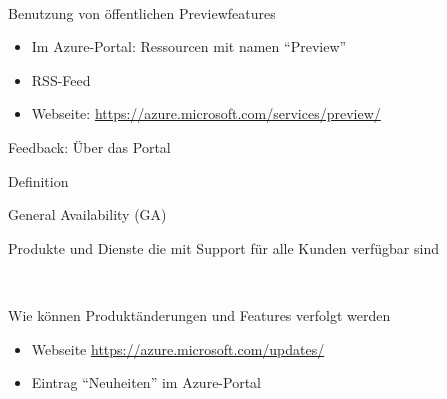 \documentclass{scrartcl}
\newenvironment{flashcard}[2][]{%
    #1
    \vfill
    \centerline{\Large{#2}}
    \vfill
\newpage
}
{\newpage}
\begin{document}
    \begin{flashcard}[\ ]{Benutzung von öffentlichen Previewfeatures}
        \begin{itemize}
            \item Im Azure-Portal: Ressourcen mit namen ``Preview''
            \item RSS-Feed
            \item Webseite: \href{https://azure.microsoft.com/services/preview/}{https://azure.microsoft.com/services/preview/}
        \end{itemize}

        \vspace{5mm}
        Feedback: Über das Portal
    \end{flashcard}

    \begin{flashcard}[Definition]{General Availability (GA)}
        Produkte und Dienste die mit Support für alle Kunden verfügbar sind
    \end{flashcard}

    \begin{flashcard}[\ ]{Wie können Produktänderungen und Features verfolgt werden}
        \begin{itemize}
            \item Webseite \href{https://azure.microsoft.com/updates/}{https://azure.microsoft.com/updates/}
            \item Eintrag ``Neuheiten'' im Azure-Portal
        \end{itemize}

    \end{flashcard}

    \doclicenseThis
    \pagebreak
\end{document}
